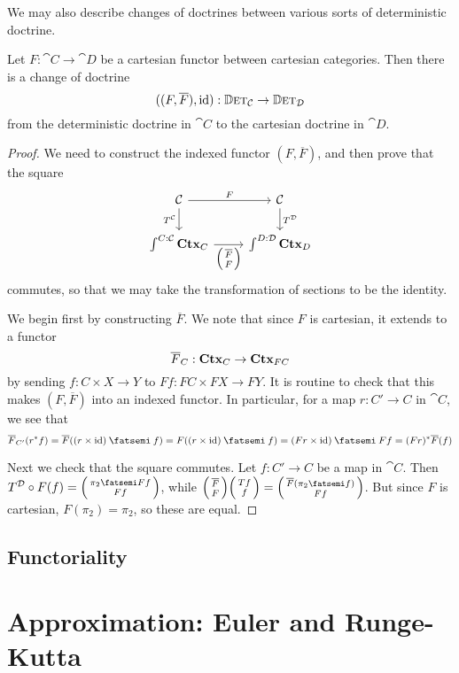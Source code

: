 \documentclass[DynamicalBook]{subfiles}
\begin{document}
We may also describe changes of doctrines between various sorts of deterministic
doctrine. 
\begin{proposition}\label{prop.change_of_doctrine_cartesian}
Let $F : \cat{C} \to \cat{D}$ be a cartesian functor between cartesian
categories. Then there is a change of doctrine
\[
((F, \overline{F}), \mathrm{id}) : \mathbb{D}\textsc{et}_{\mathcal{C}} \to \mathbb{D}\textsc{et}_{\mathcal{D}} 
\]
from the deterministic doctrine in $\cat{C}$ to the cartesian doctrine in $\cat{D}$.
\end{proposition}
\begin{proof}
We need to construct the indexed functor $(F, \overline{F})$, and then prove
that the square 
\[
  \begin{tikzcd}
\cat{C} \ar[r, "F"]\ar[d,"T^{\cat{C}}"'] & \cat{C}  \ar[d,"T^{\cat{D}}"]\\
  \int^{C : \cat{C}}\smctx{C} \ar[r, "{\littlelens{\overline{F}}{F}}"']  & \int^{D : \cat{D}}
  \smctx{D}  
  \end{tikzcd}
\]
commutes, so that we may take the transformation of sections to be the identity.

We begin first by constructing $\overline{F}$. We note that since $F$ is
cartesian, it extends to a functor
$$\overline{F}_C : \textbf{Ctx}_{C} \to \textbf{Ctx}_{FC}$$
by sending $f : C \times X \to Y$ to $Ff : FC \times FX \to FY$. It is routine
to check that this makes $(F, \overline{F})$ into an indexed functor. In
particular, for a map
$r : C' \to C$ in $\cat{C}$, we see that
\[
\overline{F}_{C'}(r^{\ast}f) = \overline{F}((r \times \id) \then f) = F((r
\times \id) \then f) = (Fr \times \id) \then Ff = (Fr)^{\ast}\overline{F}(f)
\]

Next we check that the square commutes. Let $f : C' \to C$ be a map in
$\cat{C}$. Then $T^{\cat{D}} \circ F (f) = \lens{\pi_2 \then Ff}{Ff}$, while
$\lens{\overline{F}}{F}\lens{Tf}{f} = \lens{\overline{F}(\pi_2 \then f)}{Ff}$.
But since $F$ is cartesian, $F(\pi_2) = \pi_2$, so these are equal.
\end{proof}

\subsection{Functoriality}

\section{Approximation: Euler and Runge-Kutta}
\end{document}
